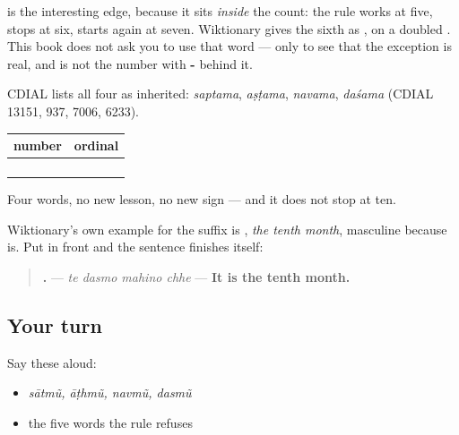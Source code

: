 \textbf{} is the interesting edge, because it sits \emph{inside} the count: the rule works at five, stops at six, starts again at seven. Wiktionary gives the sixth as \textbf{}, on a doubled \textbf{}. This book does not ask you to use that word — only to see that the exception is real, and is not the number with \textbf{-} behind it.

\begin{cousinweb}
CDIAL lists all four as inherited: \emph{saptama}, \emph{aṣṭama}, \emph{navama}, \emph{daśama} (CDIAL 13151, 937, 7006, 6233).
\end{cousinweb}

\begin{grammarlens}[title={What you've built: four ordinals nobody taught you}]
\noindent
\begin{tabularx}{\linewidth}{@{}>{\raggedright\arraybackslash}X>{\raggedright\arraybackslash}X@{}}
\toprule
\textbf{number} & \textbf{ordinal} \\
\midrule
\textbf{\gu{સાત}} & \textbf{\gu{સાતમું}} \\
\textbf{\gu{આઠ}} & \textbf{\gu{આઠમું}} \\
\textbf{\gu{નવ}} & \textbf{\gu{નવમું}} \\
\textbf{\gu{દસ}} & \textbf{\gu{દસમું}} \\
\bottomrule
\end{tabularx}

Four words, no new lesson, no new sign — and it does not stop at ten.

Wiktionary's own example for the suffix is \textbf{ }, \emph{the tenth month}, masculine because \textbf{} is. Put \textbf{} in front and the sentence finishes itself:

\begin{quote}
\textbf{   .} — \emph{te dasmo mahino chhe} — \textbf{It is the tenth month.}
\end{quote}
\end{grammarlens}

\subsection*{Your turn}
Say these aloud:

\begin{itemize}
\raggedright
  \item \emph{sātmũ, āṭhmũ, navmũ, dasmũ}
  \item the five words the rule refuses
\end{itemize}

